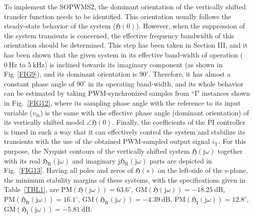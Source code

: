 \documentclass[journal,a4paper,10pt,twoside]{IEEEtran} %
\begin{document}
	 To implement the SOPWMS2, the dominant {\color{red}orientation} of the vertically shifted transfer function needs to be identified. This {\color{red}orientation} usually follows the steady-state behavior of the system ($\mathfrak{H}(0)$). However, when the suppression of the system transients is concerned, the effective frequency bandwidth of this {\color{red}orientation} should be determined. This step has been taken in Section III, and it has been shown that the given system in its effective band-width of operation ($0~\mathrm{Hz}$ to $5~\mathrm{kHz}$) is inclined towards its imaginary component (as shown in Fig~\ref{FIG9}), and its dominant orientation is $90^\circ$. Therefore, it has almost a constant phase angle of $90^\circ$ in its operating band-width, and its whole behavior can be estimated by taking PWM-synchronized samples from
	 ``I" instances shown in Fig.~\ref{FIG12}, where its sampling phase angle with the reference to its input variable ($v_\mathrm{in}$) is the same with the effective phase angle (dominant orientation) of its vertically shifted model $\angle \mathfrak{H}(0)$. Finally, the coefficients of the PI controller is tuned in such a way that it can effectively control the system and stabilize its transients with the use of the obtained PWM-sampled output signal $i_\mathrm{T}$. For this purpose, the Nyquist contours of the vertically shifted system $\mathfrak{H}(\mathrm{j}\omega)$ together with its real $\mathfrak{H}_\mathrm{R}(\mathrm{j}\omega)$ and imaginary $\mathrm{j}\mathfrak{H}_\mathrm{R}(\mathrm{j}\omega)$ parts are depicted in Fig.~\ref{FIG13}. Having all poles and zeros of $\mathfrak{H}(s)$ on the left-side of the s-plane, the minimum stability margins of these systems, with the specifications given in Table~\ref{TBL1}, are {\color{red}$\mathrm{PM}(\mathfrak{H}(\mathrm{j}\omega))=63.6^\circ$,} $\mathrm{GM}(\mathfrak{H}(\mathrm{j}\omega))=-18.25~\mathrm{dB}$, $\mathrm{PM}(\mathfrak{H}_\mathrm{R}(\mathrm{j}\omega))=16.1^\circ$, $\mathrm{GM}(\mathfrak{H}_\mathrm{R}(\mathrm{j}\omega))=-4.39 ~\mathrm{dB}$, $\mathrm{PM}(\mathfrak{H}_\mathrm{I}(\mathrm{j}\omega))=12.8^\circ$, $\mathrm{GM}(\mathfrak{H}_\mathrm{I}(\mathrm{j}\omega))=-5.81~ \mathrm{dB}$.
	 
\end{document}
